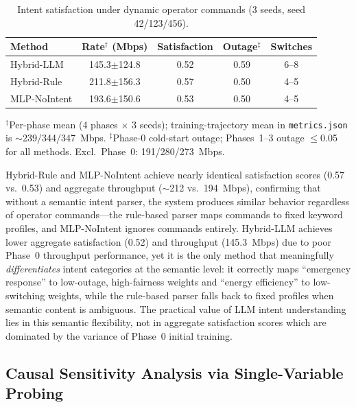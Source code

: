 \documentclass[conference]{IEEEtran}
\begin{document}
\begin{table}[t]
\centering
\caption{Intent satisfaction under dynamic operator commands (3 seeds, seed 42/123/456).}
\label{tab:intent}
\begin{tabular}{lcccc}
\toprule
Method & Rate$^\dagger$ (Mbps) & Satisfaction & Outage$^\ddagger$ & Switches \\
\midrule
Hybrid-LLM    & 145.3$\pm$124.8 & 0.52 & 0.59 & 6--8 \\
Hybrid-Rule   & 211.8$\pm$156.3 & 0.57 & 0.50 & 4--5 \\
MLP-NoIntent  & 193.6$\pm$150.6 & 0.53 & 0.50 & 4--5 \\
\bottomrule
\end{tabular}
\vspace{2pt}
\begin{minipage}{\columnwidth}
{\footnotesize $^\dagger$Per-phase mean (4 phases $\times$ 3 seeds); training-trajectory mean in \texttt{metrics.json} is $\sim$239/344/347~Mbps. $^\ddagger$Phase-0 cold-start outage; Phases~1--3 outage $\leq$0.05 for all methods. Excl.\ Phase~0: 191/280/273~Mbps.}
\end{minipage}
\end{table}

Hybrid-Rule and MLP-NoIntent achieve nearly identical satisfaction scores (0.57 vs.\ 0.53) and aggregate throughput ($\sim$212 vs.\ 194~Mbps), confirming that without a semantic intent parser, the system produces similar behavior regardless of operator commands---the rule-based parser maps commands to fixed keyword profiles, and MLP-NoIntent ignores commands entirely. Hybrid-LLM achieves lower aggregate satisfaction (0.52) and throughput (145.3~Mbps) due to poor Phase~0 throughput performance, yet it is the only method that meaningfully \emph{differentiates} intent categories at the semantic level: it correctly maps ``emergency response'' to low-outage, high-fairness weights and ``energy efficiency'' to low-switching weights, while the rule-based parser falls back to fixed profiles when semantic content is ambiguous. The practical value of LLM intent understanding lies in this semantic flexibility, not in aggregate satisfaction scores which are dominated by the variance of Phase~0 initial training.

\subsection{Causal Sensitivity Analysis via Single-Variable Probing}
\label{sec:probe}
\end{document}
